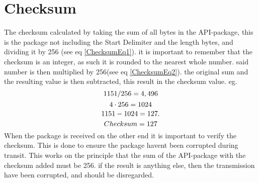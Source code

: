   \section{Checksum}
  The checksum calculated by taking the sum of all bytes in the API-package, this is the package not including the Start Delimiter and the length bytes, and dividing it by 256 (see eq \ref{ChecksumEq1}). it is important to remember that the checksum is an integer, as such it is rounded to the nearest whole number. said number is then multiplied by 256(see eq \ref{ChecksumEq2}). the original sum and the resulting value is then subtracted, this result in the checksum value.
eg.
\begin{equation}\label{ChecksumEq1}
1151/256=4,496\\
\end{equation}
\begin{equation}\label{ChecksumEq2}
4 \cdot 256=1024\\
\end{equation}
\begin{equation}\label{ChecksumEq3}
1151-1024=127.\\ 
\end{equation}
\begin{equation}\label{ChecksumEq4}
Checksum=127\\ 
\end{equation}
When the package is received on the other end it is important to verify the checksum. This is done to ensure the package havent been corrupted during transit.
This works on the principle that the sum of the API-package with the checksum added must be 256. if the result is anything else, then the transmission have been corrupted, and should be disregarded.
